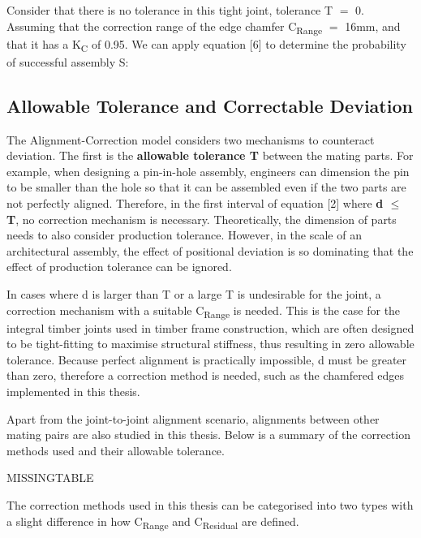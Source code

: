 Consider that there is no tolerance in this tight joint, tolerance T $=$ 0. Assuming that the correction range of the edge chamfer C\textsubscript{Range} $=$ 16mm, and that it has a K\textsubscript{C} of 0.95. We can apply equation [6] to determine the probability of successful assembly S:


\subsection{Allowable Tolerance and Correctable Deviation}

The Alignment-Correction model considers two mechanisms to counteract deviation. The first is the \textbf{allowable tolerance T} between the mating parts. For example, when designing a pin-in-hole assembly, engineers can dimension the pin to be smaller than the hole so that it can be assembled even if the two parts are not perfectly aligned. Therefore, in the first interval of equation [2] where \textbf{d $\leq$ T}, no correction mechanism is necessary. Theoretically, the dimension of parts needs to also consider production tolerance. However, in the scale of an architectural assembly, the effect of positional deviation is so dominating that the effect of production tolerance can be ignored.

In cases where d is larger than T or a large T is undesirable for the joint, a correction mechanism with a suitable C\textsubscript{Range} is needed. This is the case for the integral timber joints used in timber frame construction, which are often designed to be tight-fitting to maximise structural stiffness, thus resulting in zero allowable tolerance. Because perfect alignment is practically impossible, d must be greater than zero, therefore a correction method is needed, such as the chamfered edges implemented in this thesis.

Apart from the joint-to-joint alignment scenario, alignments between other mating pairs are also studied in this thesis. Below is a summary of the correction methods used and their allowable tolerance. 

MISSINGTABLE

The correction methods used in this thesis can be categorised into two types with a slight difference in how C\textsubscript{Range} and C\textsubscript{Residual} are defined.

